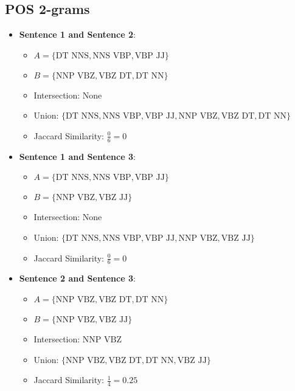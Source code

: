 \documentclass{article}
\begin{document}
\subsection*{POS 2-grams}
\begin{itemize}
    \item \textbf{Sentence 1 and Sentence 2}:
    \begin{itemize}
        \item \( A = \{ \text{DT NNS}, \text{NNS VBP}, \text{VBP JJ} \} \)
        \item \( B = \{ \text{NNP VBZ}, \text{VBZ DT}, \text{DT NN} \} \)
        \item Intersection: None
        \item Union: \( \{ \text{DT NNS}, \text{NNS VBP}, \text{VBP JJ}, \text{NNP VBZ}, \text{VBZ DT}, \text{DT NN} \} \)
        \item Jaccard Similarity: \( \frac{0}{6} = 0 \)
    \end{itemize}

    \item \textbf{Sentence 1 and Sentence 3}:
    \begin{itemize}
        \item \( A = \{ \text{DT NNS}, \text{NNS VBP}, \text{VBP JJ} \} \)
        \item \( B = \{ \text{NNP VBZ}, \text{VBZ JJ} \} \)
        \item Intersection: None
        \item Union: \( \{ \text{DT NNS}, \text{NNS VBP}, \text{VBP JJ}, \text{NNP VBZ}, \text{VBZ JJ} \} \)
        \item Jaccard Similarity: \( \frac{0}{6} = 0 \)
    \end{itemize}

    \item \textbf{Sentence 2 and Sentence 3}:
    \begin{itemize}
        \item \( A = \{ \text{NNP VBZ}, \text{VBZ DT}, \text{DT NN} \} \)
        \item \( B = \{ \text{NNP VBZ}, \text{VBZ JJ} \} \)
        \item Intersection: \( \text{NNP VBZ} \)
        \item Union: \( \{ \text{NNP VBZ}, \text{VBZ DT}, \text{DT NN}, \text{VBZ JJ} \} \)
        \item Jaccard Similarity: \( \frac{1}{4} = 0.25 \)
    \end{itemize}
\end{itemize}
\end{document}
